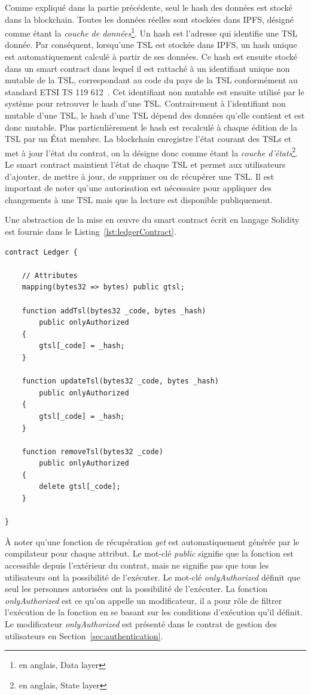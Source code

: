 \documentclass{tnreport}
\begin{document}
Comme expliqué dans la partie précédente, seul le hash des données est stocké dans la blockchain.
Toutes les données réelles sont stockées dans IPFS, désigné comme étant la {\em couche de données}\footnote{en anglais, Data layer}. 
Un hash est l'adresse qui identifie une TSL donnée. 
Par conséquent, lorsqu'une TSL est stockée dans IPFS, un hash unique est automatiquement calculé à partir de ses données. 
Ce hash est ensuite stocké dans un smart contract dans lequel il est rattaché à un identifiant unique non mutable de la TSL, correspondant au code du pays de la TSL conformément au standard ETSI TS 119 612~\cite{ETSITS119612}.
Cet identifiant non mutable est ensuite utilisé par le système pour retrouver le hash d'une TSL.
Contrairement à l'identifiant non mutable d'une TSL, le hash d'une TSL dépend des données qu'elle contient et est donc mutable. 
Plus particulièrement le hash est recalculé à chaque édition de la TSL par un État membre.
La blockchain enregistre l'état courant des TSLs et met à jour l'état du contrat, on la désigne donc comme étant la {\em couche d'états}\footnote{en anglais, State layer}. 
Le smart contract maintient l'état de chaque TSL et permet aux utilisateurs d'ajouter, de mettre à jour, de supprimer ou de récupérer une TSL.
Il est important de noter qu'une autorisation est nécessaire pour appliquer des changements à une TSL mais que la lecture est disponible publiquement.

Une abstraction de la mise en œuvre du smart contract écrit en langage Solidity est fournie dans le Listing~\ref{lst:ledgerContract}.

\clearpage
\begin{lstlisting}[language=solidity, basicstyle=\small, caption={Ledger Contract}, label={lst:ledgerContract}]
contract Ledger {
	
	// Attributes
	mapping(bytes32 => bytes) public gtsl;
	
	function addTsl(bytes32 _code, bytes _hash)
		public onlyAuthorized
	{
		gtsl[_code] = _hash;
	}
	
	function updateTsl(bytes32 _code, bytes _hash)
		public onlyAuthorized
	{
		gtsl[_code] = _hash;
	}
	
	function removeTsl(bytes32 _code)
		public onlyAuthorized
	{
		delete gtsl[_code];
	}
	
}
\end{lstlisting}

À noter qu'une fonction de récupération {\em get} est automatiquement générée par le compilateur pour chaque attribut. Le mot-clé {\em public} signifie que la fonction est accessible depuis l'extérieur du contrat, mais ne signifie pas que tous les utilisateurs ont la possibilité de l'exécuter. Le mot-clé {\em onlyAuthorized} définit que seul les personnes autorisées ont la possibilité de l'exécuter. La fonction {\em onlyAuthorized} est ce qu'on appelle un modificateur, il a pour rôle de filtrer l'exécution de la fonction en se basant sur les conditions d'exécution qu'il définit. Le modificateur {\em onlyAuthorized} est présenté dans le contrat de gestion des utilisateurs en Section~\ref{sec:authentication}.
\end{document}
